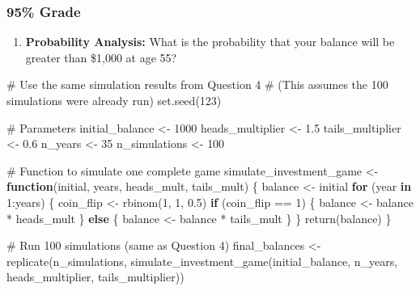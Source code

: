 \documentclass[
  letterpaper,
  DIV=11,
  numbers=noendperiod]{scrartcl}
\newenvironment{Shaded}{\begin{snugshade}}{\end{snugshade}}
\newcommand{\CommentTok}[1]{\textcolor[rgb]{0.37,0.37,0.37}{#1}}
\newcommand{\ControlFlowTok}[1]{\textcolor[rgb]{0.00,0.23,0.31}{\textbf{#1}}}
\newcommand{\DecValTok}[1]{\textcolor[rgb]{0.68,0.00,0.00}{#1}}
\newcommand{\FloatTok}[1]{\textcolor[rgb]{0.68,0.00,0.00}{#1}}
\newcommand{\FunctionTok}[1]{\textcolor[rgb]{0.28,0.35,0.67}{#1}}
\newcommand{\NormalTok}[1]{\textcolor[rgb]{0.00,0.23,0.31}{#1}}
\newcommand{\OtherTok}[1]{\textcolor[rgb]{0.00,0.23,0.31}{#1}}
\newcommand{\SpecialCharTok}[1]{\textcolor[rgb]{0.37,0.37,0.37}{#1}}
\providecommand{\tightlist}{%
  \setlength{\itemsep}{0pt}\setlength{\parskip}{0pt}}
\begin{document}
\subsubsection{95\% Grade}\label{grade-2}

\begin{enumerate}
\def\labelenumi{\arabic{enumi}.}
\setcounter{enumi}{4}
\tightlist
\item
  \textbf{Probability Analysis:} What is the probability that your
  balance will be greater than \$1,000 at age 55?
\end{enumerate}

\begin{Shaded}
\begin{Highlighting}[]
\CommentTok{\# Use the same simulation results from Question 4}
\CommentTok{\# (This assumes the 100 simulations were already run)}
\FunctionTok{set.seed}\NormalTok{(}\DecValTok{123}\NormalTok{)}

\CommentTok{\# Parameters}
\NormalTok{initial\_balance }\OtherTok{\textless{}{-}} \DecValTok{1000}
\NormalTok{heads\_multiplier }\OtherTok{\textless{}{-}} \FloatTok{1.5}
\NormalTok{tails\_multiplier }\OtherTok{\textless{}{-}} \FloatTok{0.6}
\NormalTok{n\_years }\OtherTok{\textless{}{-}} \DecValTok{35}
\NormalTok{n\_simulations }\OtherTok{\textless{}{-}} \DecValTok{100}

\CommentTok{\# Function to simulate one complete game}
\NormalTok{simulate\_investment\_game }\OtherTok{\textless{}{-}} \ControlFlowTok{function}\NormalTok{(initial, years, heads\_mult, tails\_mult) \{}
\NormalTok{  balance }\OtherTok{\textless{}{-}}\NormalTok{ initial}
  \ControlFlowTok{for}\NormalTok{ (year }\ControlFlowTok{in} \DecValTok{1}\SpecialCharTok{:}\NormalTok{years) \{}
\NormalTok{    coin\_flip }\OtherTok{\textless{}{-}} \FunctionTok{rbinom}\NormalTok{(}\DecValTok{1}\NormalTok{, }\DecValTok{1}\NormalTok{, }\FloatTok{0.5}\NormalTok{)}
    \ControlFlowTok{if}\NormalTok{ (coin\_flip }\SpecialCharTok{==} \DecValTok{1}\NormalTok{) \{}
\NormalTok{      balance }\OtherTok{\textless{}{-}}\NormalTok{ balance }\SpecialCharTok{*}\NormalTok{ heads\_mult}
\NormalTok{    \} }\ControlFlowTok{else}\NormalTok{ \{}
\NormalTok{      balance }\OtherTok{\textless{}{-}}\NormalTok{ balance }\SpecialCharTok{*}\NormalTok{ tails\_mult}
\NormalTok{    \}}
\NormalTok{  \}}
  \FunctionTok{return}\NormalTok{(balance)}
\NormalTok{\}}

\CommentTok{\# Run 100 simulations (same as Question 4)}
\NormalTok{final\_balances }\OtherTok{\textless{}{-}} \FunctionTok{replicate}\NormalTok{(n\_simulations, }
  \FunctionTok{simulate\_investment\_game}\NormalTok{(initial\_balance, n\_years, heads\_multiplier, tails\_multiplier))}


\end{Highlighting}
\end{Shaded}
\end{document}
